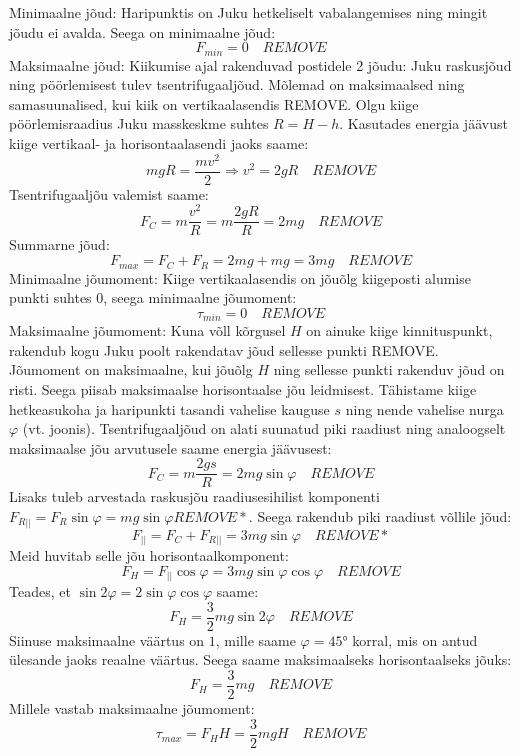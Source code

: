 \documentclass[10pt]{article}
\newcommand{\pp}[1]{REMOVE}
\begin{document}
\setAuthor{}

\solu
\osa Minimaalne jõud: Haripunktis on Juku hetkeliselt vabalangemises ning mingit jõudu ei avalda. Seega on minimaalne jõud: 
$$F_{min} = 0 \quad\pp{1.5}$$ 
Maksimaalne jõud: Kiikumise ajal rakenduvad postidele 2 jõudu: Juku raskusjõud ning pöörlemisest tulev tsentrifugaaljõud. Mõlemad on maksimaalsed ning samasuunalised, kui kiik on vertikaalasendis \pp{0.5}. Olgu kiige pöörlemisraadius Juku masskeskme suhtes $R = H-h$. Kasutades energia jäävust kiige vertikaal- ja horisontaalasendi jaoks saame: 
$$mgR = \frac{mv^2}{2} \Rightarrow v^2 = 2gR \quad\pp{1}$$ 
Tsentrifugaaljõu valemist saame:
$$F_C = m\frac{v^2}{R} = m\frac{2gR}{R} = 2mg \quad\pp{1}$$ 
Summarne jõud:
$$F_{max} = F_C + F_R = 2mg + mg = 3mg \quad\pp{0.5}$$ 
\osa Minimaalne jõumoment: Kiige vertikaalasendis on jõuõlg kiigeposti alumise punkti suhtes $0$, seega minimaalne jõumoment:
$$\tau_{min} = 0\quad\pp{1}$$ 
Maksimaalne jõumoment: Kuna võll kõrgusel $H$ on ainuke kiige kinnituspunkt, rakendub kogu Juku poolt rakendatav jõud sellesse punkti \pp{0.5}. Jõumoment on maksimaalne, kui jõuõlg $H$ ning sellesse punkti rakenduv jõud on risti. Seega piisab maksimaalse horisontaalse jõu leidmisest. Tähistame kiige hetkeasukoha ja haripunkti tasandi vahelise kauguse $s$ ning nende vahelise nurga $\varphi$ (vt. joonis). Tsentrifugaaljõud on alati suunatud piki raadiust ning analoogselt maksimaalse jõu arvutusele saame energia jäävusest:
$$F_C = m\frac{2gs}{R} = 2mg\sin{\varphi}\quad\pp{1}$$ 
Lisaks tuleb arvestada raskusjõu raadiusesihilist komponenti $F_{R||} = F_R\sin{\varphi} = mg\sin{\varphi}\pp{1.5}*$.
Seega rakendub piki raadiust võllile jõud:
$$F_{||} = F_C + F_{R||} = 3mg\sin{\varphi}\quad\pp{0.5}*$$ 
Meid huvitab selle jõu horisontaalkomponent:
$$F_H = F_{||}\cos{\varphi} = 3mg\sin{\varphi}\cos{\varphi}\quad\pp{0.5}$$ 
Teades, et $\sin{2\varphi}=2\sin{\varphi}\cos{\varphi}$ saame:
$$F_H = \frac{3}{2}mg\sin{2\varphi}\quad\pp{1}$$ 
Siinuse maksimaalne väärtus on $1$, mille saame $\varphi = \ang{45}$ korral, mis on antud ülesande jaoks reaalne väärtus. Seega saame maksimaalseks horisontaalseks jõuks:
$$F_H = \frac{3}{2}mg\quad\pp{1}$$ 
Millele vastab maksimaalne jõumoment:
$$\tau_{max} = F_HH = \frac{3}{2}mgH\quad\pp{0.5}$$ 
\end{document}
